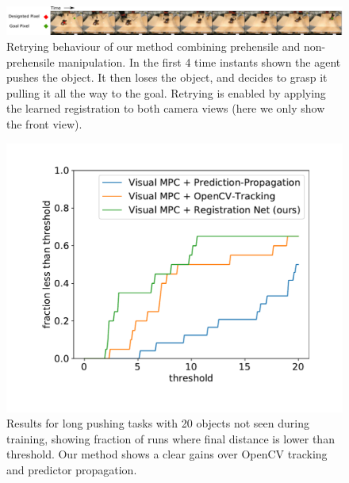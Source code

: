 \begin{figure}
    \centering
    \includegraphics[width=1.0\textwidth]{images_rfr/pick_place_plush.pdf}
    \caption{\small{Retrying behaviour of our method combining prehensile and non-prehensile manipulation. In the first 4 time instants shown the agent pushes the object. It then loses the object, and decides to grasp it pulling it all the way to the goal. Retrying is enabled by applying the learned registration to both camera views (here we only show the front view).}}
    \label{fig:discrete}
\end{figure}

\begin{figure}
	\centering
	\includegraphics[width=0.6\columnwidth]{images_rfr/pushlong_bench_same_range.pdf}
	\caption{\small{Results for long pushing tasks with 20 objects not seen during training, showing fraction of runs where final distance is lower than threshold. Our method shows a clear gains over OpenCV tracking and predictor propagation.}}
	\label{fig:push_bench_long}
\end{figure}

